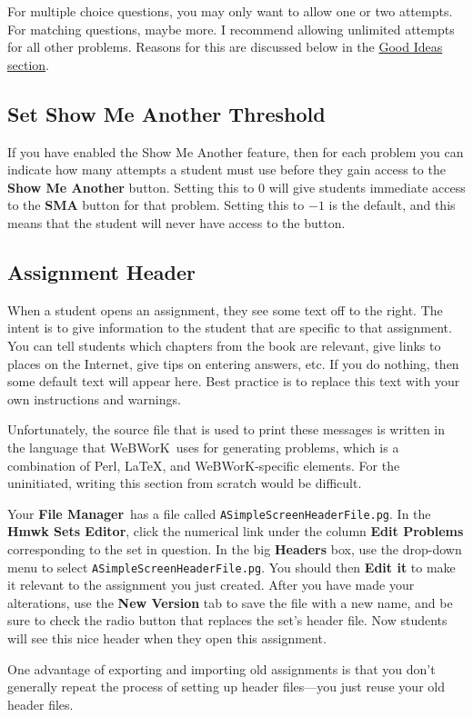 \documentclass[12pt]{article}
\newcommand{\menu}[1]{\textbf{#1}}
\newcommand{\WW}{WeBWorK}
\newcommand{\HSE}{\menu{Hmwk Sets Editor}}
\newcommand{\FM}{\menu{File Manager}}
\begin{document}
For multiple choice questions, you may only want to allow one or two attempts.
For matching questions, maybe more.
I recommend allowing unlimited attempts for all other problems.
Reasons for this are discussed below in the \hyperref[goodideas]{Good Ideas section}.

\subsection{Set Show Me Another Threshold}
If you have enabled the Show Me Another feature, then for each problem you can indicate how many attempts a student must use before they gain access to the \menu{Show Me Another} button.
Setting this to $0$ will give students immediate access to the \menu{SMA} button for that problem.
Setting this to $-1$ is the default, and this means that the student will never have access to the button.

\subsection{Assignment Header}
When a student opens an assignment, they see some text off to the right.
The intent is to give information to the student that are specific to that assignment.
You can tell students which chapters from the book are relevant, give links to places on the Internet, give tips on entering answers, etc.
If you do nothing, then some default text will appear here.
Best practice is to replace this text with your own instructions and warnings.

Unfortunately, the source file that is used to print these messages is written in the language that \WW\ uses for generating problems, which is a combination of Perl, \LaTeX, and \WW-specific elements.
For the uninitiated, writing this section from scratch would be difficult.

Your \FM\  has a file called \texttt{ASimpleScreenHeaderFile.pg}.
In the \HSE, click the numerical link under the column \menu{Edit Problems} corresponding to the set in question.
In the big \menu{Headers} box, use the drop-down menu to select \texttt{ASimpleScreenHeaderFile.pg}.
You should then \menu{Edit it} to make it relevant to the assignment you just created.
After you have made your alterations, use the \menu{New Version} tab to save the file with a new name, and be sure to check the radio button that replaces the set's header file.
Now students will see this nice header when they open this assignment.

One advantage of exporting and importing old assignments is that you don't generally repeat the process of setting up header files---you just reuse your old header files.
\end{document}
